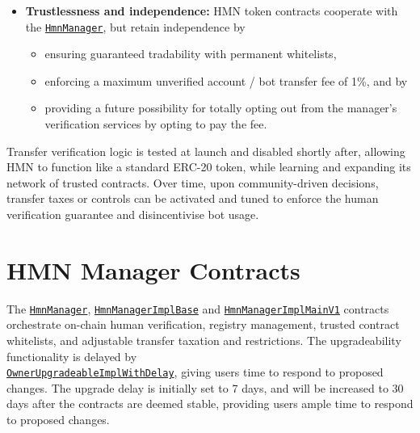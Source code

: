 \documentclass[12pt,a4paper]{article}
\begin{document}
\begin{itemize}
\begin{itemize}
          \end{itemize}
    \item \textbf{Trustlessness and independence:} HMN token contracts cooperate with the \texttt{\href{https://github.com/hmn-is/hmn-contracts/blob/main/src/HmnManager.sol}{HmnManager}}, but retain independence by
          \begin{itemize}
            \item ensuring guaranteed tradability with permanent whitelists,
            \item enforcing a maximum unverified account / bot transfer fee of 1\%, and by
            \item providing a future possibility for totally opting out from the manager's verification services by opting to pay the fee.
          \end{itemize}
\end{itemize}

Transfer verification logic is tested at launch and disabled shortly after, allowing HMN to function like a standard ERC-20 token, while learning and expanding its network of trusted contracts.
Over time, upon community-driven decisions, transfer taxes or controls can be activated and tuned to enforce the human verification guarantee and disincentivise bot usage.

\section{HMN Manager Contracts}
The \texttt{\href{https://github.com/hmn-is/hmn-contracts/blob/main/src/HmnManager.sol}{HmnManager}}, \texttt{\href{https://github.com/hmn-is/hmn-contracts/blob/main/src/HmnManagerImplBase.sol}{HmnManagerImplBase}} and \texttt{\href{https://github.com/hmn-is/hmn-contracts/blob/main/src/HmnManagerImplMainV1.sol}{HmnManagerImplMainV1}}
contracts orchestrate on-chain human verification, registry management, trusted contract whitelists, and adjustable transfer taxation and restrictions.
The upgradeability functionality is delayed by\\\texttt{\href{https://github.com/hmn-is/hmn-contracts/blob/main/src/abstract/OwnerUpgradeableImplWithDelay.sol}{OwnerUpgradeableImplWithDelay}}, giving users time to respond to proposed changes.
The upgrade delay is initially set to 7 days, and will be increased to 30 days after the contracts are deemed stable, providing users ample time to respond to proposed changes.
\end{document}
